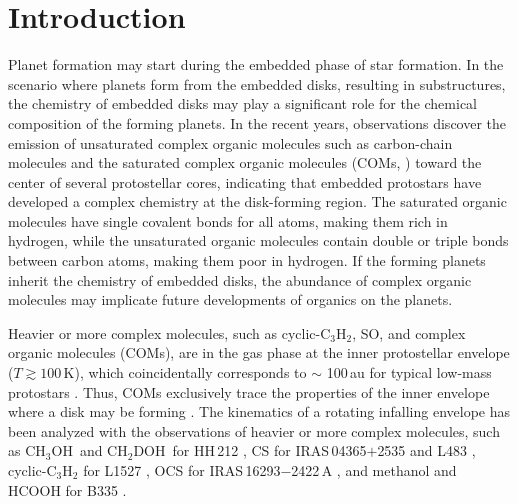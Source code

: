 \documentclass[twocolumn]{aastex62}
\newcommand{\methanol}{\mbox{CH$_{3}$OH}}
\newcommand{\dmethanol}{\mbox{CH$_{2}$DOH}}
\begin{document}
\section{Introduction}


Planet formation may start during the embedded phase of star formation.  In the scenario where planets form from the embedded disks, resulting in substructures, the chemistry of embedded disks may play a significant role for the chemical composition of the forming planets.  In the recent years, observations discover the emission of unsaturated complex organic molecules such as carbon-chain molecules \citep[e.g., ][]{2013ChRv..113.8981S,2014Natur.507...78S,2018ApJ...863...88L} and the saturated complex organic molecules (COMs, \citealt[e.g., ][]{2003ApJ...593L..51C,2007A&A...463..601B,2020arXiv200607071J}) toward the center of several protostellar cores, indicating that embedded protostars have developed a complex chemistry at the disk-forming region.  The saturated organic molecules have single covalent bonds for all atoms, making them rich in hydrogen, while the unsaturated organic molecules contain double or triple bonds between carbon atoms, making them poor in hydrogen.  If the forming planets inherit the chemistry of embedded disks, the abundance of complex organic molecules may implicate future developments of organics on the planets. 

Heavier or more complex molecules, such as cyclic-C$_{3}$H$_{2}$, SO, and complex organic molecules (COMs), are in the gas phase at the inner protostellar envelope ($T\gtrsim100$\,K), which coincidentally corresponds to $\sim$ 100\,au for typical low-mass protostars \citep{2020ApJ...891...61Y}.  Thus, COMs exclusively trace the properties of the inner envelope where a disk may be forming \citep{2013ChRv..113.8961A,2014Natur.507...78S}.  The kinematics of a rotating infalling envelope has been analyzed with the observations of heavier or more complex molecules, such as \methanol\ and \dmethanol\ for HH\,212 \citep{2017ApJ...843...27L}, CS for IRAS\,04365$+$2535 \citep{2016ApJ...820L..34S} and L483 \citep{2017ApJ...837..174O}, cyclic-C$_{3}$H$_{2}$ for L1527 \citep{2014Natur.507...78S}, OCS for IRAS\,16293$-$2422\,A \citep{2016ApJ...824...88O}, and methanol and HCOOH for B335 \citep{2019ApJ...873L..21I}.
\end{document}
